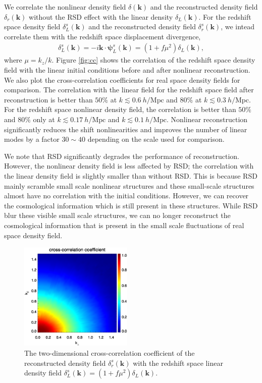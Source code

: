 \documentclass[aps,prd,twocolumn,superscriptaddress,groupedaddress,nofootinbib,amsfont]{revtex4}  %
\newcommand{\mr}{\mathrm}
\newcommand{\bea}{\begin{eqnarray}}
\newcommand{\eea}{\end{eqnarray}}
\newcommand{\bmp}{\bm{\psi}}
\newcommand{\bmk}{\bm{k}}
\begin{document}
We correlate the nonlinear density field $\delta(\bmk)$ and the reconstructed 
density field $\delta_r(\bmk)$ without the RSD effect with the linear density 
$\delta_L(\bmk)$.
For the redshift space density field $\delta_L^s(\bmk)$ and the reconstructed
density field $\delta_r^s(\bmk)$, we intead correlate them with the redshift 
space displacement divergence,
\bea
\delta^s_L(\bmk)=-i\bmk\cdot\bmp^s_L(\bmk)=(1+f\mu^2)\delta_L(\bmk),
\eea
where $\mu=k_z/k$.
Figure \ref{fig:cc} shows the correlation of the redshift space density field 
with the linear initial conditions before and after nonlinear reconstruction.
We also plot the cross-correlation coefficients for real space density fields
for comparison. 
The correlation with the linear field for the redshift space field after 
reconstruction is better than $50\%$ at $k\lesssim0.6\ h/\mr{Mpc}$ and $80\%$
at $k\lesssim0.3\ h/\mr{Mpc}$. For the redshift space nonlinear density field, 
the correlation is better than $50\%$ and $80\%$ only at $k\lesssim0.17\ h/\mr{Mpc}$ and $k\lesssim0.1\ h/\mr{Mpc}$.
Nonlinear reconstruction significantly reduces the shift nonlinearities and 
improves the number of linear modes by a factor $30\sim40$ depending on the 
scale used for comparison.

We note that RSD significantly degrades the performance of reconstruction.
However, the nonlinear density field is less affected by RSD; the correlation
with the linear density field is slightly smaller than without RSD.
This is because RSD mainly scramble small scale nonlinear structures and these 
small-scale structures almost have no correlation with the initial conditions.
However, we can recover the cosmological information which is still present in 
these structures. While RSD blur these visible small scale structures, we can  
no longer reconstruct the cosmological information that is present in the small
scale fluctuations of real space density field.

\begin{figure}[tbp]
\begin{center}
\includegraphics[width=0.48\textwidth]{0.000anixcc_deltaRsxLs_4x.eps}
\end{center}
\vspace{-0.7cm}
\caption{The two-dimensional cross-correlation coefficient of the reconstructed
density field $\delta_r^s(\bmk)$ with the redshift space linear density field 
$\delta_L^s(\bmk)=(1+f\mu^2)\delta_L(\bmk)$.}
\label{fig:cc_Ls}
\end{figure}
\end{document}
